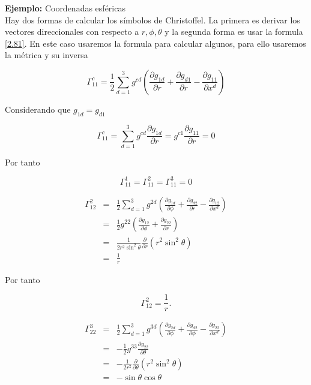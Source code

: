 \documentclass[12pt]{report}
\begin{document}
\textbf{Ejemplo:} Coordenadas esféricas\\


Hay dos formas de calcular los símbolos de Christoffel. La primera es derivar los vectores direccionales con respecto a $r,\phi,\theta$ y la segunda forma es usar la formula \eqref{2.81}. En este caso usaremos la formula para calcular algunos, para ello usaremos la métrica y su inversa

\begin{equation} \nonumber
\Gamma_{11}^c= \frac{1}{2} \displaystyle\sum_{d=1}^3 g^{cd}  \left( \frac{\partial g_{1d}}{\partial r} + \frac{\partial g_{d1}}{\partial r} -\frac{\partial g_{11}}{\partial x^d} \right)
\end{equation}

Considerando que $g_{1d}=g_{d1}$

\begin{equation} \nonumber
\Gamma_{11}^c = \displaystyle\sum_{d=1}^3 g^{cd} \frac{\partial g_{1d}}{\partial r}= g^{c1} \frac{\partial g_{11}}{\partial r} = 0
\end{equation}

Por tanto 

\begin{equation} \label{2.83}
\Gamma_{11}^1= \Gamma_{11}^2 = \Gamma_{11}^3 = 0  
\end{equation}



\begin{eqnarray} \nonumber
\Gamma_{12}^2 &=& \frac{1}{2} \displaystyle\sum_{d=1}^3 g^{2d}  \left( \frac{\partial g_{1d}}{\partial \phi} + \frac{\partial g_{d2}}{\partial r} -\frac{\partial g_{12}}{\partial x^d} \right) \\ \nonumber
&=& \frac{1}{2} g^{22} \left( \frac{\partial g_{12}}{\partial \phi} + \frac{\partial g_{22}}{\partial r} \right) \\ \nonumber
&=& \frac{1}{2r^2 \sin^2 \theta} \frac{\partial}{\partial r} \left(r^2 \sin^2 \theta \right) \\ \nonumber
&=& \frac{1}{r}
\end{eqnarray}

Por tanto 

\begin{equation}\label{2.84}
\Gamma_{12}^2= \frac{1}{r}.
\end{equation}



\begin{eqnarray} \nonumber
\Gamma_{22}^3 &=& \frac{1}{2} \displaystyle\sum_{d=1}^3 g^{3d}  \left( \frac{\partial g_{2d}}{\partial \phi} + \frac{\partial g_{d2}}{\partial \phi} -\frac{\partial g_{22}}{\partial x^d} \right) \\ \nonumber
&=&-\frac{1}{2} g^{33}\frac{\partial g_{22}}{\partial \theta} \\ \nonumber
&=& - \frac{1}{2r^2} \frac{\partial}{\partial \theta} \left( r^2 \sin^2 \theta \right) \\ \nonumber
&=& -\sin \theta \cos \theta
\end{eqnarray}
\end{document}
